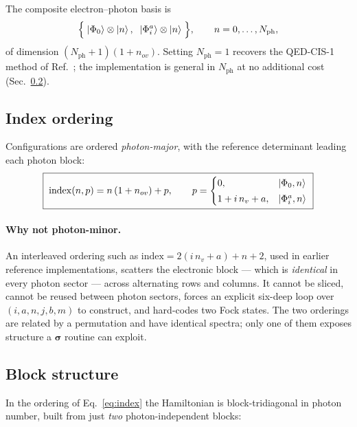 \documentclass[11pt]{article}
\newcommand{\nph}{N_{\mathrm{ph}}}
\newcommand{\nov}{n_{ov}}
\newcommand{\nvir}{n_{v}}
\begin{document}
The composite electron--photon basis is
\begin{equation}
\Bigl\{\;\ket{\Phi_0} \otimes \ket{n},\;\;
        \ket{\Phi_i^a} \otimes \ket{n} \;\Bigr\},
\qquad n = 0,\dots,\nph ,
\end{equation}
of dimension $(\nph+1)(1+\nov)$. Setting $\nph = 1$ recovers the QED-CIS-1
method of Ref.~\cite{McTague2022}; the implementation is general in $\nph$
at no additional cost (Sec.~\ref{sec:blocks}).

\subsection{Index ordering}

Configurations are ordered \emph{photon-major}, with the reference determinant
leading each photon block:
\begin{equation}
\boxed{\;
\mathrm{index}(n,p) = n\,(1 + \nov) + p,
\qquad
p =
\begin{cases}
0, & \ket{\Phi_0, n} \\[2pt]
1 + i\,\nvir + a, & \ket{\Phi_i^a, n}
\end{cases}
\;}
\label{eq:index}
\end{equation}

\paragraph{Why not photon-minor.} An interleaved ordering such as
$\mathrm{index} = 2(i\,\nvir + a) + n + 2$, used in earlier reference
implementations, scatters the electronic block --- which is \emph{identical} in
every photon sector --- across alternating rows and columns. It cannot be
sliced, cannot be reused between photon sectors, forces an explicit six-deep
loop over $(i,a,n,j,b,m)$ to construct, and hard-codes two Fock states. The two
orderings are related by a permutation and have identical spectra; only one of
them exposes structure a $\bm{\sigma}$ routine can exploit.

\subsection{Block structure}
\label{sec:blocks}

In the ordering of Eq.~\eqref{eq:index} the Hamiltonian is block-tridiagonal in
photon number, built from just \emph{two} photon-independent blocks:
\end{document}
